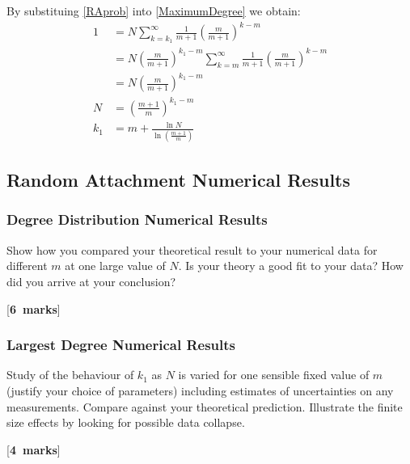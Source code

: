 \documentclass[a4paper,12pt]{article}
\newcounter{nmarks}
\newcommand{\qmarks}[1]{\addtocounter{nmarks}{#1} }
\renewcommand{\qmarks}[1]{\addtocounter{nmarks}{#1} \hspace*{\fill} [\textbf{#1~marks}]}
\begin{document}
By substituing \ref{RAprob} into \ref{MaximumDegree} we obtain:
\begin{align*}
1 &= N\sum_{k=k_1}^\infty \frac{1}{m+1}\left(\frac{m}{m+1}\right)^{k-m}\\
&= N\left(\frac{m}{m+1}\right)^{k_1-m}\sum_{k=m}^\infty \frac{1}{m+1}\left(\frac{m}{m+1}\right)^{k-m}\\
&= N\left(\frac{m}{m+1}\right)^{k_1-m}\\
N &= \left(\frac{m+1}{m}\right)^{k_1-m}\\
k_1 &= m+\frac{\ln{N}}{\ln(\frac{m+1}{m})}
\end{align*}

\subsection{Random Attachment Numerical Results}

\subsubsection{Degree Distribution Numerical Results}
Show how you compared your theoretical result to your numerical data for different $m$ at one large value of $N$.  Is your theory a good fit to your data? How did you arrive at your conclusion?  \qmarks{6}

\subsubsection{Largest Degree Numerical Results}
Study of the behaviour of $k_1$ as $N$ is varied for one sensible fixed value of $m$ (justify your choice of parameters) including estimates of uncertainties on any measurements. Compare against your theoretical prediction. Illustrate the finite size effects by looking for possible data collapse.
\qmarks{4}
\end{document}
